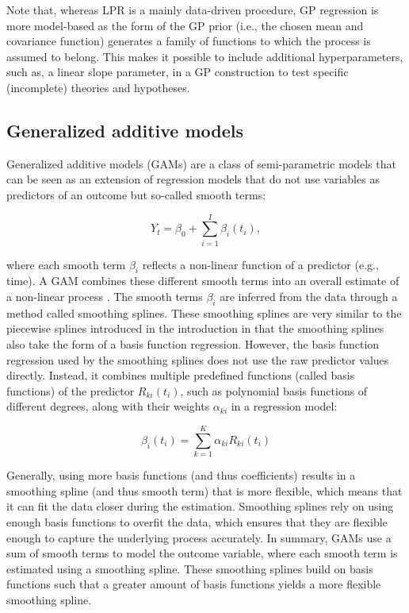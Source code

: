 \documentclass[man, floatsintext]{apa7}
\begin{document}
Note that, whereas LPR is a mainly data-driven procedure, GP regression is more
model-based as the form of the GP prior (i.e., the chosen mean and covariance
function) generates a family of functions to which the process is assumed to
belong. This makes it possible to include additional hyperparameters, such as,
a linear slope parameter, in a GP construction to test specific (incomplete)
theories and hypotheses.

\subsection{Generalized additive models}

Generalized additive models (GAMs) are a class of semi-parametric models that
can be seen as an extension of regression models that do not use variables as
predictors of an outcome but so-called smooth terms:

\begin{equation}
  Y_t = \beta_0 + \sum_{i = 1}^{I} \beta_i(t_i),
\end{equation}

\noindent where each smooth term $\beta_i$ reflects a non-linear function of a
predictor (e.g., time). A GAM combines these different smooth terms into an
overall estimate of a non-linear process \parencite{wood_generalized_2006,
  wood_inference_2020, hastie_generalized_1999}. The smooth terms $\beta_i$ are
inferred from the data through a method called smoothing splines. These
smoothing splines are very similar to the piecewise splines introduced in the
introduction in that the smoothing splines also take the form of a basis
function regression. However, the basis function regression used by the
smoothing splines does not use the raw predictor values directly. Instead, it
combines multiple predefined functions (called basis functions) of the
predictor $R_{ki}(t_i)$, such as polynomial basis functions of different
degrees, along with their weights $\alpha_{ki}$ in a regression model:

\begin{equation}
  \beta_i(t_i) = \sum^K_{k = 1} \alpha_{ki} R_{ki}(t_i)
\end{equation}

\noindent Generally, using more basis functions (and thus coefficients) results
in a smoothing spline (and thus smooth term) that is more flexible, which means
that it can fit the data closer during the estimation. Smoothing splines rely
on using enough basis functions to overfit the data, which ensures that they
are flexible enough to capture the underlying process accurately. In summary,
GAMs use a sum of smooth terms to model the outcome variable, where each smooth
term is estimated using a smoothing spline. These smoothing splines build on
basis functions such that a greater amount of basis functions yields a more
flexible smoothing spline.
\end{document}

